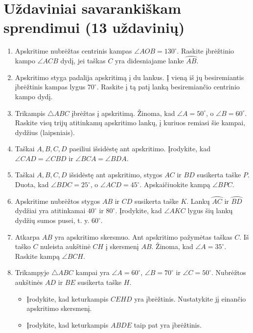 \documentclass[11pt,a4paper]{scrartcl}
\begin{document}
\section{Uždaviniai savarankiškam sprendimui (13 uždavinių)}
\begin{enumerate}
    \renewcommand{\labelenumi}{\textbf{\theenumi.}}
    
    \item Apskritime nubrėžtas centrinis kampas $\angle AOB=130^\circ$. Raskite įbrėžtinio kampo $\angle ACB$ dydį, jei taškas $C$ yra didesniajame lanke $\wideparen{AB}$.
    \item Apskritimo styga padalija apskritimą į du lankus. Į vieną iš jų besiremiantis įbrėžtinis kampas lygus $70^\circ$. Raskite į tą patį lanką besiremiančio centrinio kampo dydį.
    \item Trikampis $\triangle ABC$ įbrėžtas į apskritimą. Žinoma, kad $\angle A = 50^\circ$, o $\angle B = 60^\circ$. Raskite visų trijų atitinkamų apskritimo lankų, į kuriuos remiasi šie kampai, dydžius (laipsniais).
    \item Taškai $A, B, C, D$ paeiliui išsidėstę ant apskritimo. Įrodykite, kad $\angle CAD=\angle CBD$ ir $\angle BCA=\angle BDA$.
    \item Taškai $A, B, C, D$ išsidėstę ant apskritimo, stygos $AC$ ir $BD$ susikerta taške $P$. Duota, kad $\angle BDC = 25^\circ$, o $\angle ACD = 45^\circ$. Apskaičiuokite kampą $\angle BPC$.
    \item Apskritime nubrėžtos stygos $AB$ ir $CD$ susikerta taške $K$. Lankų $\wideparen{AC}$ ir $\wideparen{BD}$ dydžiai yra atitinkamai $40^\circ$ ir $80^\circ$. Įrodykite, kad $\angle AKC$ lygus šių lankų dydžių sumos pusei, t. y. $60^\circ$.
    \item Atkarpa $AB$ yra apskritimo skersmuo. Ant apskritimo pažymėtas taškas $C$. Iš taško $C$ nuleista aukštinė $CH$ į skersmenį $AB$. Žinoma, kad $\angle A = 35^\circ$. Raskite kampą $\angle BCH$.
    \item Trikampyje $\triangle ABC$ kampai yra $\angle A=60^\circ$, $\angle B=70^\circ$ ir $\angle C=50^\circ$. Nubrėžtos aukštinės $AD$ ir $BE$ susikerta taške $H$.
    \begin{itemize}
        \item[a)] Įrodykite, kad keturkampis $CEHD$ yra įbrėžtinis. Nustatykite jį einančio apskritimo skersmenį.
        \item[b)] Įrodykite, kad keturkampis $ABDE$ taip pat yra įbrėžtinis.
    \end{itemize}

\end{enumerate}
\end{document}
